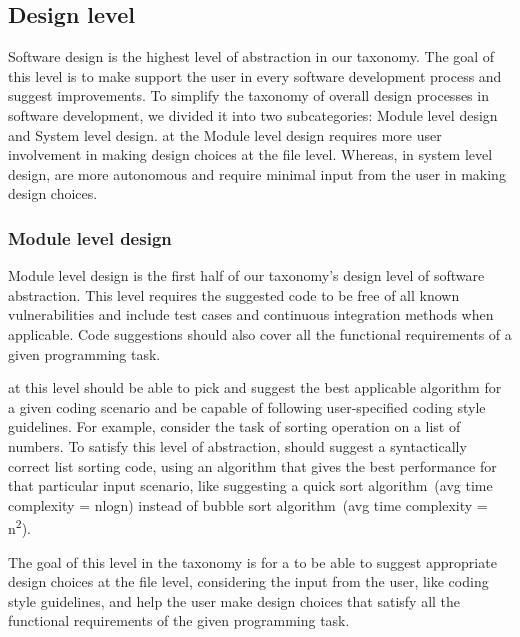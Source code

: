 \subsection{Design level}
Software design is the highest level of abstraction in our taxonomy. The goal of this level is to make \cct{} support the user in every software development process and suggest improvements.
To simplify the taxonomy of overall design processes in software development, we divided it into two subcategories: Module level design and System level design. 
\cct{} at the Module level design requires more user involvement in making design choices at the file level. Whereas, in system level design, \cct{} are more autonomous and require minimal input from the user in making design choices.

\subsubsection{Module level design}
\label{low_design}
Module level design is the first half of our taxonomy's design level of software abstraction.
This level requires the suggested code to be free of all known vulnerabilities and include test cases and continuous integration methods when applicable.
Code suggestions should also cover all the functional requirements of a given programming task.

\cct{} at this level should be able to pick and suggest the best applicable algorithm for a given coding scenario and be capable of following user-specified coding style guidelines.
For example, consider the task of sorting operation on a list of numbers. To satisfy this level of abstraction, \cct{} should suggest a syntactically correct list sorting code, using an algorithm that gives the best performance for that particular input scenario, like suggesting a quick sort algorithm~(avg time complexity = nlogn) instead of bubble sort algorithm~(avg time complexity = n\textsuperscript{2}).

The goal of this level in the taxonomy is for a \cct{} to be able to suggest appropriate design choices at the file level, considering the input from the user, like coding style guidelines, and help the user make design choices that satisfy all the functional requirements of the given programming task.

